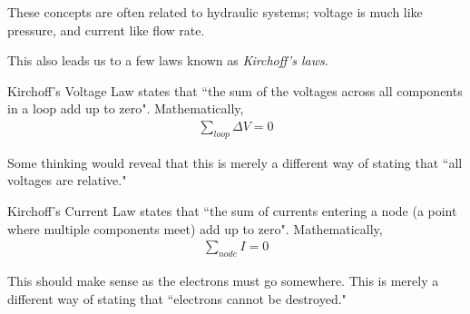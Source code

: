 These concepts are often related to hydraulic systems; voltage is much like pressure, and current like flow rate.

This also leads us to a few laws known as \textit{Kirchoff's laws}.

Kirchoff's Voltage Law states that ``the sum of the voltages across all components in a loop add up to zero". Mathematically,
\begin{align}
	\sum_{loop} \Delta V = 0
\end{align}

Some thinking would reveal that this is merely a different way of stating that ``all voltages are relative."

Kirchoff's Current Law states that ``the sum of currents entering a node (a point where multiple components meet) add up to zero". Mathematically,
\begin{align}
	\sum_{node} I = 0
\end{align}

This should make sense as the electrons must go somewhere. This is merely a different way of stating that ``electrons cannot be destroyed."